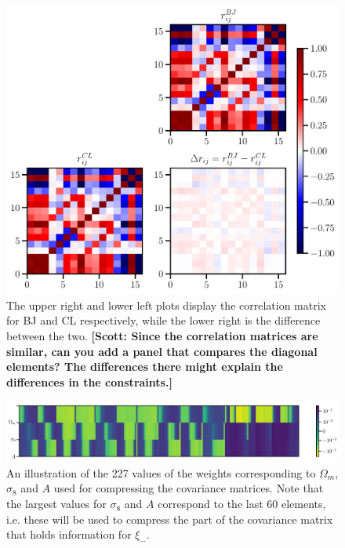 \documentclass[twocolumn]{\docclass}
\newcommand\scott[1]{{\bf [Scott: #1]}}
\begin{document}
	\begin{figure}
		\includegraphics[width=0.9\columnwidth]{Correlation_compression.pdf}
		\caption{The upper right and lower left plots display the correlation matrix for BJ and CL respectively, while the lower right is the difference between the two. \scott{Since the correlation matrices are similar, can you add a panel that compares the diagonal elements? The differences there might explain the differences in the constraints.} \label{fig:correlation}}
	\end{figure}
	
	\begin{figure}
		\includegraphics[width=2\columnwidth]{Weights.pdf}
		\caption{An illustration of the 227 values of the weights corresponding to $\Omega_m$, $\sigma_8$ and $A$ used for compressing the covariance matrices. Note that the largest values for $\sigma_8$ and $A$ correspond to the last 60 elements, i.e. these will be used to compress the part of the covariance matrix that holds information for $\xi_-$.} \label{fig:weight2pt}
	\end{figure}
	
	
	
\end{document}
